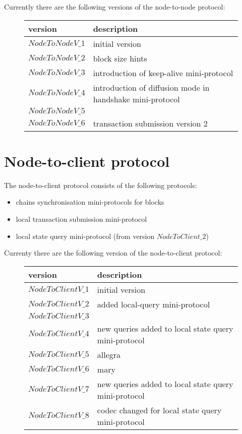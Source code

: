 Currently there are the following versions of the node-to-node protocol:
\begin{figure}[h]
\begin{tabular}{l|l}
  version         & description \\\hline\hline
  $NodeToNodeV\_1$ & initial version \\\hline
  $NodeToNodeV\_2$ & block size hints \\\hline
  $NodeToNodeV\_3$ & introduction of keep-alive mini-protocol \\\hline
  $NodeToNodeV\_4$ & introduction of diffusion mode in handshake mini-protocol \\\hline
  $NodeToNodeV\_5$ & \\\hline
  $NodeToNodeV\_6$ & transaction submission version 2 \\\hline
\end{tabular}
\end{figure}

\section{Node-to-client protocol}
\newline
{}\newline

The node-to-client protocol consists of the following protocols:
\begin{itemize}
  \item chains synchronisation mini-protocols for blocks
  \item local transaction submission mini-protocol
  \item local state query mini-protocol (from version $NodeToClient\_2$)
\end{itemize}

Currenty there are the following version of the node-to-client protocol:
\begin{figure}[h]
\begin{tabular}{l|l}
  version & description \\\hline\hline
  $NodeToClientV\_1$ & initial version\\\hline
  $NodeToClientV\_2$ & added local-query mini-protocol\\\hline
  $NodeToClientV\_3$ & \\\hline
  $NodeToClientV\_4$ & new queries added to local state query mini-protocol\\\hline
  $NodeToClientV\_5$ & allegra \\\hline
  $NodeToClientV\_6$ & mary \\\hline
  $NodeToClientV\_7$ & new queries added to local state query mini-protocol\\\hline
  $NodeToClientV\_8$ & codec changed for local state query mini-protocol\\\hline
\end{tabular}
\end{figure}



